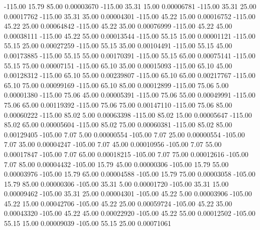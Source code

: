    -115.00     15.79     85.00     0.00003670
   -115.00     35.31     15.00     0.00006781
   -115.00     35.31     25.00     0.00017762
   -115.00     35.31     35.00     0.00004301
   -115.00     45.22     15.00     0.00016752
   -115.00     45.22     25.00     0.00064842
   -115.00     45.22     35.00     0.00076999
   -115.00     45.22     45.00     0.00038111
   -115.00     45.22     55.00     0.00013544
   -115.00     55.15     15.00     0.00001121
   -115.00     55.15     25.00     0.00027259
   -115.00     55.15     35.00     0.00104491
   -115.00     55.15     45.00     0.00173885
   -115.00     55.15     55.00     0.00170391
   -115.00     55.15     65.00     0.00075141
   -115.00     55.15     75.00     0.00007151
   -115.00     65.10     35.00     0.00015093
   -115.00     65.10     45.00     0.00128312
   -115.00     65.10     55.00     0.00239807
   -115.00     65.10     65.00     0.00217767
   -115.00     65.10     75.00     0.00099169
   -115.00     65.10     85.00     0.00012899
   -115.00     75.06      5.00     0.00001380
   -115.00     75.06     45.00     0.00005391
   -115.00     75.06     55.00     0.00049991
   -115.00     75.06     65.00     0.00119392
   -115.00     75.06     75.00     0.00147110
   -115.00     75.06     85.00     0.00060222
   -115.00     85.02      5.00     0.00063398
   -115.00     85.02     15.00     0.00005647
   -115.00     85.02     65.00     0.00005604
   -115.00     85.02     75.00     0.00060381
   -115.00     85.02     85.00     0.00129405
   -105.00      7.07      5.00     0.00000554
   -105.00      7.07     25.00     0.00000554
   -105.00      7.07     35.00     0.00004247
   -105.00      7.07     45.00     0.00010956
   -105.00      7.07     55.00     0.00017847
   -105.00      7.07     65.00     0.00018215
   -105.00      7.07     75.00     0.00012616
   -105.00      7.07     85.00     0.00004432
   -105.00     15.79     45.00     0.00000306
   -105.00     15.79     55.00     0.00003976
   -105.00     15.79     65.00     0.00004588
   -105.00     15.79     75.00     0.00003058
   -105.00     15.79     85.00     0.00000306
   -105.00     35.31      5.00     0.00001720
   -105.00     35.31     15.00     0.00009462
   -105.00     35.31     25.00     0.00004301
   -105.00     45.22      5.00     0.00003906
   -105.00     45.22     15.00     0.00042706
   -105.00     45.22     25.00     0.00059724
   -105.00     45.22     35.00     0.00043320
   -105.00     45.22     45.00     0.00022920
   -105.00     45.22     55.00     0.00012502
   -105.00     55.15     15.00     0.00009039
   -105.00     55.15     25.00     0.00071061
